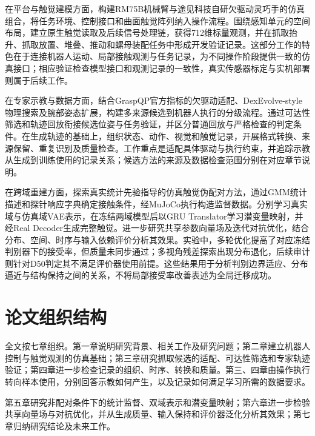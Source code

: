 在平台与触觉建模方面，构建RM75B机械臂与途见科技自研欠驱动灵巧手的仿真组合，将任务环境、控制接口和曲面触觉阵列纳入操作流程。围绕感知单元的空间布局，建立原生触觉读取及后续信号处理链，获得712维标量观测，并在抓取抬升、抓取放置、堆叠、推动和螺母装配任务中形成开发验证记录。这部分工作的特色在于连接机器人运动、局部接触观测与任务记录，为不同操作阶段提供一致的仿真接口；相应验证检查模型接口和观测记录的一致性，真实传感器标定与实机部署则属于后续工作。

在专家示教与数据方面，结合GraspQP官方指标的欠驱动适配、DexEvolve-style物理搜索及腕部姿态扩展，构建多来源候选到机器人执行的分级流程。通过可达性筛选和轨迹回放衔接候选位姿与任务验证，并区分普通回放与严格检查的判定条件。在生成轨迹的基础上，组织状态、动作、视觉和触觉记录，开展格式转换、来源保留、重复识别及质量检查。工作重点是适配具体驱动与执行约束，并追踪示教从生成到训练使用的记录关系；候选方法的来源及数据检查范围分别在对应章节说明。

在跨域重建方面，探索真实统计先验指导的仿真触觉伪配对方法，通过GMM统计描述和探针响应字典确定接触条件，经MuJoCo执行构造监督数据。分别学习真实域与仿真域VAE表示，在冻结两域模型后以GRU Translator学习潜变量映射，并经Real Decoder生成完整触觉。进一步研究共享参数向量场及迭代对抗优化，结合分布、空间、时序与输入依赖评价分析其效果。实验中，多轮优化提高了对应冻结判别器下的接受率，但质量未同步通过；多视角残差探索出现分布退化，后续审计则针对D50判定其不满足评价器使用前提。这些结果用于分析判别边界适应、分布逼近与结构保持之间的关系，不将局部接受率改善表述为全局迁移成功。

\section{论文组织结构}
\label{sec:thesis_structure}

全文按七章组织。第一章说明研究背景、相关工作及研究问题；第二章建立机器人控制与触觉观测的仿真基础；第三章研究抓取候选的适配、可达性筛选和专家轨迹验证；第四章进一步检查记录的组织、时序、转换和质量。第三、四章由操作执行转向样本使用，分别回答示教如何产生，以及记录如何满足学习所需的数据要求。

第五章研究非配对条件下的统计监督、双域表示和潜变量映射；第六章进一步检验共享向量场与对抗优化，并从生成质量、输入保持和评价器泛化分析其效果；第七章归纳研究结论及未来工作。
